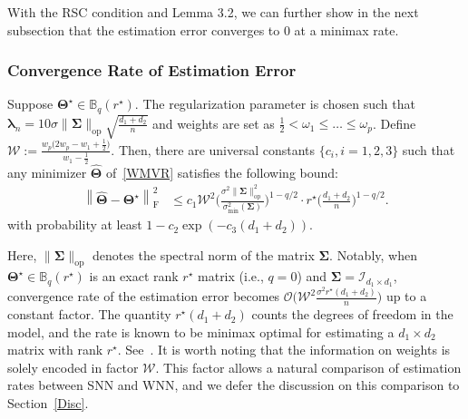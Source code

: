 \documentclass[alpha-refs]{wiley-article}
\begin{document}
With the RSC condition and Lemma 3.2, we can further show in the next subsection that the estimation error converges to $0$ at a minimax rate.

\subsubsection{Convergence Rate of Estimation Error}
\begin{theorem} \label{thm2}
Suppose $\boldsymbol{\Theta^{\star}}\in\mathbb{B}_{q}(r^{\star})$.
The regularization parameter is chosen such that $\boldsymbol{\lambda}_{n}=10\sigma\|\boldsymbol{\Sigma}\|_{\text{op}} \sqrt{\frac{d_{1}+d_{2}}{n}}$ and weights are set
as $\frac{1}{2} < \omega_{1} \leq \dots \leq \omega_{p}$.
Define $\mathcal{W}:=\frac{w_{p}\big(2w_{p}-w_{1}+\frac{1}{2}\big)}{w_{1}-\frac{1}{2}}$.
Then, there are universal constants $\{c_{i},i=1,2,3\}$ such that any minimizer $\boldsymbol{\widehat{\Theta}}$ of~\eqref{WMVR} satisfies the following bound:
\begin{align} \label{Rate}
    \left\| \widehat{\boldsymbol{\Theta}} - \boldsymbol{\Theta^{\star}} \right\|_{\text{F}}^{2}
    &\leq c_{1} \mathcal{W}^{2} \Bigg( \frac{\sigma^{2}\|\boldsymbol{\Sigma}\|_{\text{op}}^{2}}{\sigma_{\text{min}}^{2}(\boldsymbol{\Sigma})} \Bigg)^{1-q/2}
    \cdot r^{\star} \Bigg( \frac{d_{1}+d_{2}}{n} \Bigg)^{1-q/2}.
\end{align}
with probability at least $1-c_{2}\exp(-c_{3}(d_{1}+d_{2}))$.
\end{theorem}

Here, $\|\boldsymbol{\Sigma}\|_{\text{op}}$ denotes the spectral norm of the matrix $\boldsymbol{\Sigma}$.
Notably, when $\boldsymbol{\Theta^{\star}}\in\mathbb{B}_{q}(r^{\star})$ is an exact rank $r^{\star}$ matrix (i.e., $q=0$) and $\boldsymbol{\Sigma} = \mathcal{I}_{d_{1} \times d_{1}}$,
convergence rate of the estimation error becomes $\mathcal{O}\big( \mathcal{W}^{2} \frac{ \sigma^{2} r^{\star} (d_{1}+d_{2}) }{n} \big)$ up to a constant factor.
The quantity $r^{\star} (d_{1}+d_{2})$ counts the degrees of freedom in the model, and the rate is known to be minimax optimal for estimating a $d_{1} \times d_{2}$ matrix with rank $r^{\star}$.
See~\citet{negahban2011estimation,koltchinskii2011nuclear,rohde2011estimation}.
It is worth noting that the information on weights is solely encoded in factor $\mathcal{W}$.
This factor allows a natural comparison of estimation rates between SNN and WNN, and we defer the discussion on this comparison to Section~\ref{Disc}.
\end{document}

